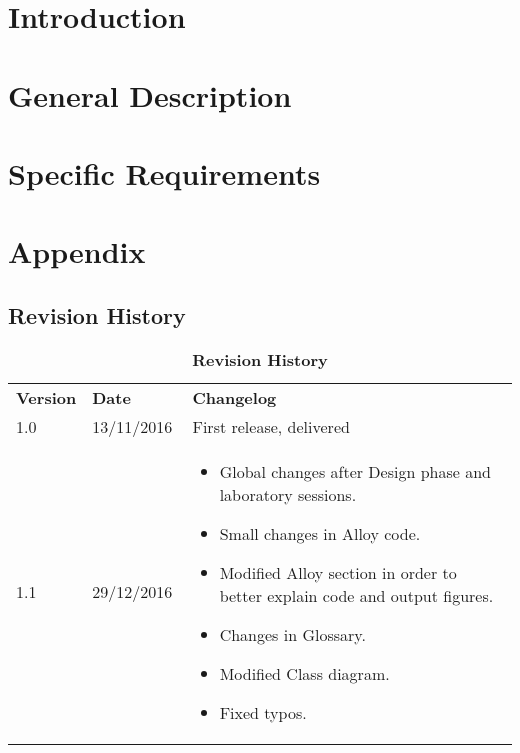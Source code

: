 \maketitle
\clearpage
\tableofcontents

\clearpage
\section{Introduction} \label{Intro}


\clearpage
\section{General Description} \label{Description}


\clearpage
\section{Specific Requirements} \label {Requirements}


\clearpage
\section{Appendix}


\clearpage
\subsection{Revision History}
\begin{longtable}{|p{0.1\linewidth} | p{0.2\linewidth} | p{0.7\linewidth} | }
	\captionsetup{labelformat=empty} %
	\caption{\textbf{Revision History}} %
	\label{tab:rev_history} \\ %
	\hline

	\textbf{Version} & \textbf{Date} & \textbf{Changelog} \\ \hline
	1.0 & 13/11/2016 & First release, delivered \\ \hline
	1.1 & 29/12/2016 & 
	\begin{itemize}
		\item Global changes after Design phase and laboratory sessions.
		\item Small changes in Alloy code.
		\item Modified Alloy section in order to better explain code and output figures.
		\item Changes in Glossary.
		\item Modified Class diagram.
		\item Fixed typos.
	\end{itemize}\\ \hline
\end{longtable}

